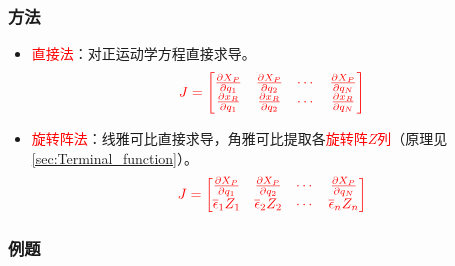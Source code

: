 \documentclass[
12pt, %
a4paper, 
oneside, %
]{scrartcl}
\begin{document}
\subsubsection[方法]{方法}
\begin{itemize}
\item \textcolor{red}{直接法}：对正运动学方程直接求导。
$$ \textcolor{red}{J = \begin{bmatrix} \frac{\partial X_P}{\partial q_1} & \frac{\partial X_P}{\partial q_2} & \cdots & \frac{\partial X_P}{\partial q_N} \\ \frac{\partial x_R}{\partial q_1} & \frac{\partial x_R}{\partial q_2} & \cdots & \frac{\partial x_R}{\partial q_N} \end{bmatrix}} $$
\item \textcolor{red}{旋转阵法}：线雅可比直接求导，角雅可比提取各\textcolor{red}{旋转阵$ Z $列}（原理见\ref{sec:Terminal_function}）。\label{sec:Terminal_function_back}
$$ \textcolor{red}{J = \begin{bmatrix} \frac{\partial X_P}{\partial q_1} & \frac{\partial X_P}{\partial q_2} & \cdots & \frac{\partial X_P}{\partial q_N} \\ \overline{\epsilon}_1 Z_1 & \overline{\epsilon}_2 Z_2 & \cdots & \overline{\epsilon}_n Z_n \end{bmatrix}} $$
\end{itemize} 
\subsubsection[例题]{例题}
\end{document}
